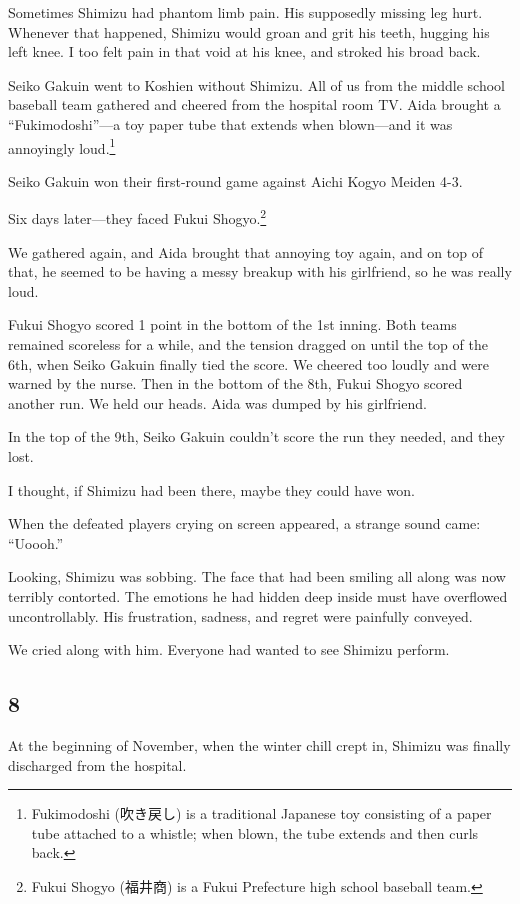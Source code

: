 \documentclass[
    a4paper,
    12pt,
    twoside,
    openany,
    UTF8,
    fontset=windows
]{ctexbook}
\begin{document}
Sometimes Shimizu had phantom limb pain. His supposedly missing leg hurt. Whenever that happened, Shimizu would groan and grit his teeth, hugging his left knee. I too felt pain in that void at his knee, and stroked his broad back.

Seiko Gakuin went to Koshien without Shimizu. All of us from the middle school baseball team gathered and cheered from the hospital room TV. Aida brought a ``Fukimodoshi''---a toy paper tube that extends when blown---and it was annoyingly loud.\footnote{Fukimodoshi (吹き戻し) is a traditional Japanese toy consisting of a paper tube attached to a whistle; when blown, the tube extends and then curls back.}

Seiko Gakuin won their first-round game against Aichi Kogyo Meiden 4-3.

Six days later---they faced Fukui Shogyo.\footnote{Fukui Shogyo (福井商) is a Fukui Prefecture high school baseball team.}

We gathered again, and Aida brought that annoying toy again, and on top of that, he seemed to be having a messy breakup with his girlfriend, so he was really loud.

Fukui Shogyo scored 1 point in the bottom of the 1st inning. Both teams remained scoreless for a while, and the tension dragged on until the top of the 6th, when Seiko Gakuin finally tied the score. We cheered too loudly and were warned by the nurse. Then in the bottom of the 8th, Fukui Shogyo scored another run. We held our heads. Aida was dumped by his girlfriend.

In the top of the 9th, Seiko Gakuin couldn't score the run they needed, and they lost.

I thought, if Shimizu had been there, maybe they could have won.

When the defeated players crying on screen appeared, a strange sound came: ``Uoooh.''

Looking, Shimizu was sobbing. The face that had been smiling all along was now terribly contorted. The emotions he had hidden deep inside must have overflowed uncontrollably. His frustration, sadness, and regret were painfully conveyed.

We cried along with him. Everyone had wanted to see Shimizu perform.


\subsection*{8}

At the beginning of November, when the winter chill crept in, Shimizu was finally discharged from the hospital.
\end{document}

